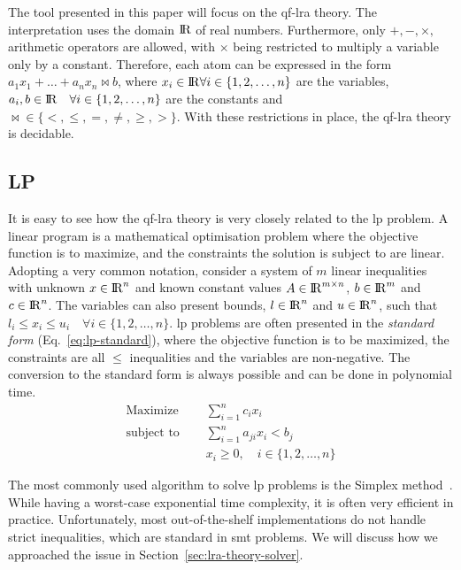\documentclass[runningheads]{llncs}
\begin{document}
The tool presented in this paper will focus on the \gls{qf-lra} theory.
The interpretation uses the domain ${\rm I\!R}$ of real numbers.
Furthermore, only $+, -, \times,$ arithmetic operators are allowed, with $\times$ being restricted to multiply a variable only by a constant.
Therefore, each atom can be expressed in the form $a_1x_1 + \ldots + a_nx_n \bowtie b$, where $x_i \in {\rm I\!R} \forall i \in \{1, 2, \dots, n\}$ are the variables, $a_i, b \in {\rm I\!R} \quad \forall i \in \{1, 2, \dots, n\}$ are the constants and $\bowtie \in \{<, \le, =, \ne, \ge, >\}$.
With these restrictions in place, the \gls{qf-lra} theory is decidable.

\subsection{LP}
\label{sec:lp}

It is easy to see how the \gls{qf-lra} theory is very closely related to the \gls{lp} problem.
A linear program is a mathematical optimisation problem where the objective function is to maximize, and the constraints the solution is subject to are linear.
Adopting a very common notation, consider a system of $m$ linear inequalities with unknown $x \in {\rm I\!R}^n$ and known constant values $A \in {\rm I\!R}^{m \times n}$, $b \in {\rm I\!R}^m$ and $c \in {\rm I\!R}^n$.
The variables can also present bounds, $l \in {\rm I\!R}^n$ and $u \in {\rm I\!R}^n$, such that $l_i \le x_i \le u_i \quad \forall i \in \{1, 2, \ldots, n\}$.
\gls{lp} problems are often presented in the \textit{standard form} (Eq.~\ref{eq:lp-standard}), where the objective function is to be maximized, the constraints are all $\le$ inequalities and the variables are non-negative.
The conversion to the standard form is always possible and can be done in polynomial time.
\begin{equation}
    \label{eq:lp-standard}
    \begin{split}
        \text{Maximize }   \quad & \sum_{i=1}^{n} c_i x_i                      \\
        \text{subject to } \quad & \sum_{i=1}^{n} a_{ji}x_{i} < b_j            \\
        & x_i \ge 0,  \quad i \in \{1, 2, \ldots, n\}
    \end{split}
\end{equation}

The most commonly used algorithm to solve \gls{lp} problems is the Simplex method~\cite{ref:simplex}.
While having a worst-case exponential time complexity, it is often very efficient in practice.
Unfortunately, most out-of-the-shelf implementations do not handle strict inequalities, which are standard in \gls{smt} problems.
We will discuss how we approached the issue in Section~\ref{sec:lra-theory-solver}.
\end{document}
